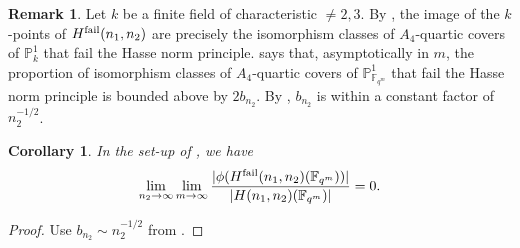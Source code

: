 \documentclass{amsart}
\numberwithin{equation}{section} \numberwithin{figure}{section}
\newcommand\FF{\mathbb{F}}
\newcommand\PP{\mathbb{P}}
\theoremstyle{one}
\newtheorem{corollary}[theorem]{\textbf{Corollary}}
\theoremstyle{definition}
\newtheorem{remark}[theorem]{Remark}
\begin{document}
\begin{remark} Let \(k\) be a finite field of characteristic \(\neq 2,3\).
  By , the image of the $k$-points of \(H^{\rm fail}(n_1,n_2)\) are precisely the isomorphism classes of \(A_4\)-quartic covers of $\PP^1_k$ that fail the Hasse norm principle.
 says that, asymptotically in \(m\), the proportion of isomorphism classes of \(A_{4}\)-quartic covers of \(\PP^1_{\FF_{q^m}}\) that fail the Hasse norm principle is bounded above by \(2b_{n_2}\).
By , \(b_{n_2}\) is within a constant factor of \(n_2^{-1/2}\).
\end{remark}

\begin{corollary}\label{cor:failbound-limit}
  In the set-up of , we have
  \[ \lim_{n_2 \to \infty }\lim_{m \to \infty} \frac{|\phi(H^{\rm fail}(n_1,n_2)(\FF_{q^m}))|}{|H(n_1,n_2)(\FF_{q^m})|} = 0.\]
\end{corollary}
\begin{proof}
  Use \(b_{n_2} \sim n_2^{-1/2}\) from .
\end{proof}
\end{document}
